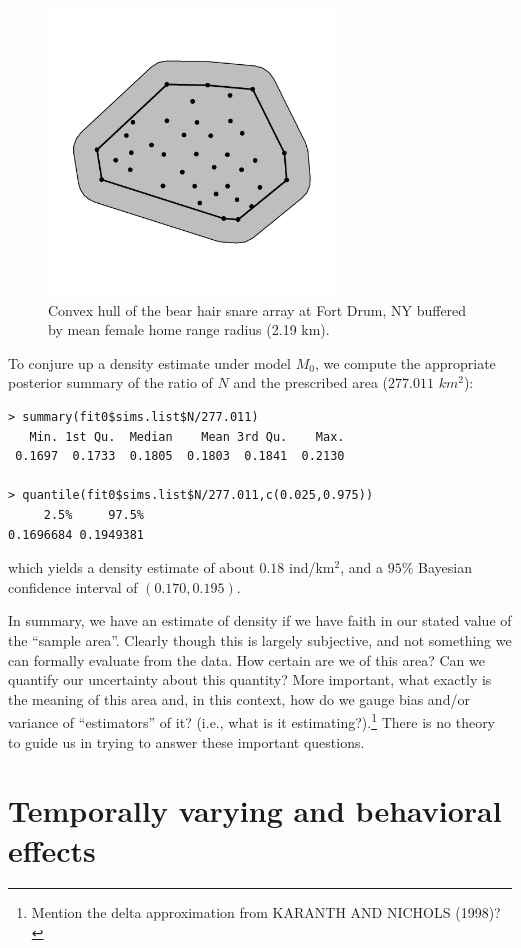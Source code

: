 \begin{figure}
\begin{center}
\includegraphics[height=3in,width=3in]{Ch3/figs/bufferedCH}
\end{center}
\caption{Convex hull of the bear hair snare array at Fort Drum, NY buffered by mean female
home range radius (2.19 km).}
\label{closed.fig.bch}
\end{figure}

To conjure up a
density estimate under model $M_0$, we compute the appropriate
posterior summary of the ratio of $N$ and the prescribed area ($277.011$ $km^2$):
{\small
\begin{verbatim}
> summary(fit0$sims.list$N/277.011)
   Min. 1st Qu.  Median    Mean 3rd Qu.    Max.
 0.1697  0.1733  0.1805  0.1803  0.1841  0.2130

> quantile(fit0$sims.list$N/277.011,c(0.025,0.975))
     2.5%     97.5%
0.1696684 0.1949381
\end{verbatim}
}
which yields a density estimate of about $0.18$ ind/km$^2$, and a $95\%$ Bayesian
confidence interval of $(0.170, 0.195)$.

In summary, we have an estimate of density if we have faith in our
stated value of the ``sample area''. Clearly though this is largely
subjective, and not something we can formally evaluate from the data.
How certain are we of this area? Can
we quantify our uncertainty about this quantity? 
 More important, what exactly is
the meaning of this area and, in this context, how do we gauge bias
and/or variance of ``estimators'' of it? (i.e., what is it
estimating?).\footnote{Mention the delta approximation from
KARANTH AND NICHOLS (1998)?}
There is no theory to guide us in trying to answer these important questions.


\section{Temporally varying and behavioral effects}

